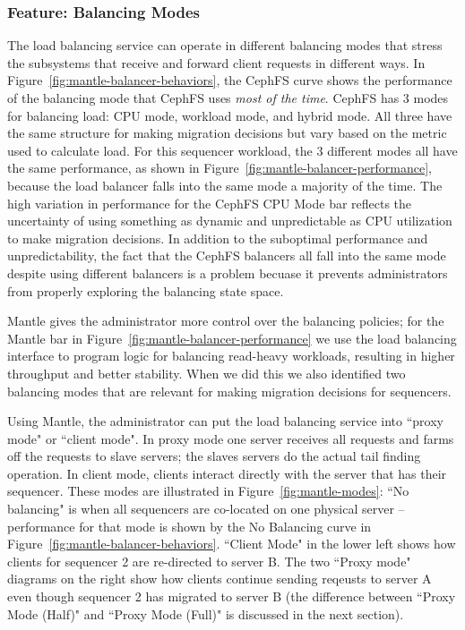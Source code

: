 \documentclass[preprint]{sigplanconf-eurosys}
\begin{document}
\subsubsection{Feature: Balancing Modes}
\label{sec:feature-balancing-modes}

The load balancing service can operate in different balancing modes that stress
the subsystems that receive and forward client requests in different ways. In
Figure~\ref{fig:mantle-balancer-behaviors}, the CephFS curve shows the
performance of the balancing mode that CephFS uses {\it most of the time}.
CephFS has 3 modes for balancing load: CPU mode, workload mode, and hybrid
mode. All three have the same structure for making migration decisions but vary
based on the metric used to calculate load. For this sequencer workload, the 3
different modes all have the same performance, as shown in
Figure~\ref{fig:mantle-balancer-performance}, because the load balancer falls
into the same mode a majority of the time.  The high variation in performance
for the CephFS CPU Mode bar reflects the uncertainty of using something as
dynamic and unpredictable as CPU utilization to make migration decisions. In
addition to the suboptimal performance and unpredictability, the fact that the
CephFS balancers all fall into the same mode despite using different balancers
is a problem becuase it prevents administrators from properly exploring the
balancing state space.

Mantle gives the administrator more control over the balancing policies; for
the Mantle bar in Figure~\ref{fig:mantle-balancer-performance} we use the load
balancing interface to program logic for balancing read-heavy workloads,
resulting in higher throughput and better stability.  When we did this we also
identified two balancing modes that are relevant for making migration decisions
for sequencers. 

Using Mantle, the administrator can put the load balancing service into ``proxy
mode" or ``client mode". In proxy mode one server receives all requests and
farms off the requests to slave servers; the slaves servers do the actual tail
finding operation. In client mode, clients interact directly with the server
that has their sequencer.  These modes are illustrated in
Figure~\ref{fig:mantle-modes}: ``No balancing" is when all sequencers are
co-located on one physical server -- performance for that mode is shown by the
No Balancing curve in Figure~\ref{fig:mantle-balancer-behaviors}.  ``Client
Mode" in the lower left shows how clients for sequencer 2 are re-directed to
server B. The two ``Proxy mode" diagrams on the right show how clients continue
sending reqeusts to server A even though sequencer 2 has migrated to server B
(the difference between ``Proxy Mode (Half)" and ``Proxy Mode (Full)" is
discussed in the next section).
\end{document}
